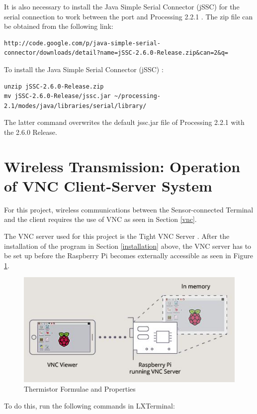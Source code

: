 It is also necessary to install the Java Simple Serial Connector (jSSC) for the serial connection to work between the port and Processing 2.2.1 \cite{installingprocessing}. The zip file can be obtained from the following link: 

\begin{lstlisting}
http://code.google.com/p/java-simple-serial-connector/downloads/detail?name=jSSC-2.6.0-Release.zip&can=2&q=
\end{lstlisting}

To install the Java Simple Serial Connector (jSSC) \cite{installingprocessing}: 
\begin{lstlisting}
unzip jSSC-2.6.0-Release.zip
mv jSSC-2.6.0-Release/jssc.jar ~/processing-2.1/modes/java/libraries/serial/library/
\end{lstlisting} 

The latter command overwrites the default jssc.jar file of Processing 2.2.1 with the 2.6.0 Release. 

\section{Wireless Transmission: Operation of VNC Client-Server System}

For this project, wireless communications between the Sensor-connected Terminal and the client requires the use of VNC as seen in Section \ref{vnc}. 

The VNC server used for this project is the Tight VNC Server \cite{rpitightvncserver}. After the installation of the program in Section \ref{installation} above, the VNC server has to be set up before the Raspberry Pi becomes externally accessible as seen in Figure \ref{rpi3vnc}. 

\begin{figure}[H]
	\centering
	\includegraphics[width=0.7\linewidth]{rpi3vnc.jpg}
	\caption{Thermistor Formulae and Properties \cite{rpitightvncserver}}
	\label{rpi3vnc}
\end{figure}

To do this, run the following commands in LXTerminal: 


